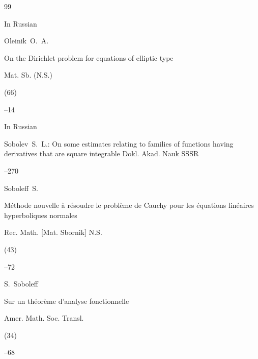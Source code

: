 \begin{thebibliography}{99}




\lang In Russian

\by Oleinik~O.~A.

\paper On the Dirichlet problem for equations of elliptic type

\jour Mat. Sb. (N.S.)


(66)


--14






\lang In Russian

\by Sobolev~S.~L.: On some estimates relating to families of functions having derivatives that are square integrable \jour Dokl. Akad. Nauk SSSR 



--270






\by Soboleff~S.

\paper M\'ethode nouvelle \`a r\'esoudre le probl\`eme de Cauchy pour les \'equations lin\'eaires hyperboliques normales

\jour Rec. Math. [Mat. Sbornik] N.S.


(43)


--72






\by S.~Soboleff

\paper Sur un th\'eor\`eme d'analyse fonctionnelle

\jour Amer. Math. Soc. Transl.


(34)

--68






\end{thebibliography}
